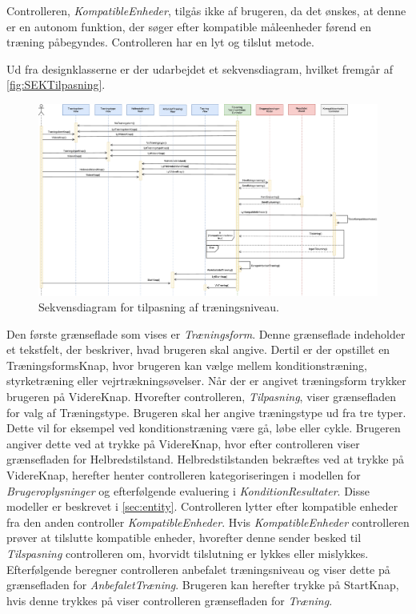 \noindent 
Controlleren, \textit{KompatibleEnheder}, tilgås ikke af brugeren, da det ønskes, at denne er en autonom funktion, der søger efter kompatible måleenheder førend en træning påbegyndes. Controlleren har en lyt og tilslut metode. 

Ud fra designklasserne er der udarbejdet et sekvensdiagram, hvilket fremgår af \autoref{fig:SEKTilpasning}. 

\begin{figure} [H]
\centering
\includegraphics[width=1\textwidth]{figures/Sek/SEKTilpasning}
\caption{Sekvensdiagram for tilpasning af træningsniveau.}
\label{fig:SEKTilpasning}
\end{figure}

\noindent
Den første grænseflade som vises er \textit{Træningsform}. Denne grænseflade indeholder et tekstfelt, der beskriver, hvad brugeren skal angive. Dertil er der opstillet en TræningsformsKnap, hvor brugeren kan vælge mellem konditionstræning, styrketræning eller vejrtrækningsøvelser. Når der er angivet træningsform trykker brugeren på VidereKnap. Hvorefter controlleren, \textit{Tilpasning}, viser grænsefladen for valg af Træningstype. Brugeren skal her angive træningstype ud fra tre typer. Dette vil for eksempel ved konditionstræning være gå, løbe eller cykle. Brugeren angiver dette ved at trykke på VidereKnap, hvor efter controlleren viser grænsefladen for Helbredstilstand. Helbredstilstanden bekræftes ved at trykke på VidereKnap, herefter henter controlleren kategoriseringen i modellen for \textit{Brugeroplysninger} og efterfølgende evaluering i \textit{KonditionResultater}. Disse modeller er beskrevet i \autoref{sec:entity}.
Controlleren lytter efter kompatible enheder fra den anden controller \textit{KompatibleEnheder}. Hvis \textit{KompatibleEnheder} controlleren prøver at tilslutte kompatible enheder, hvorefter denne sender besked til \textit{Tilspasning} controlleren om, hvorvidt tilslutning er lykkes eller mislykkes. Efterfølgende beregner controlleren anbefalet træningsniveau og viser dette på grænsefladen for \textit{AnbefaletTræning}. Brugeren kan herefter trykke på StartKnap, hvis denne trykkes på viser controlleren grænsefladen for \textit{Træning}. 




